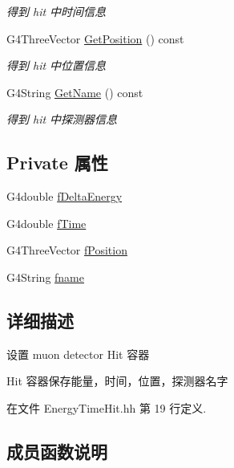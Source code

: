 \begin{DoxyCompactItemize}
\begin{DoxyCompactList}\small\item\em 得到 hit 中时间信息 \end{DoxyCompactList}\item 
G4\+Three\+Vector \hyperlink{classEnergyTimeHit_a4611709e7caf2e34f4e368dd8c4e8ad4}{Get\+Position} () const
\begin{DoxyCompactList}\small\item\em 得到 hit 中位置信息 \end{DoxyCompactList}\item 
G4\+String \hyperlink{classEnergyTimeHit_a7e348ee943ce7065910e75b0063108d5}{Get\+Name} () const
\begin{DoxyCompactList}\small\item\em 得到 hit 中探测器信息 \end{DoxyCompactList}\end{DoxyCompactItemize}
\subsection*{Private 属性}
\begin{DoxyCompactItemize}
\item 
G4double \hyperlink{classEnergyTimeHit_a3979f4ac628b68fad49d5014267bbb61}{f\+Delta\+Energy}
\item 
G4double \hyperlink{classEnergyTimeHit_a1c7ce3f598d87ae1855d7edb833d4486}{f\+Time}
\item 
G4\+Three\+Vector \hyperlink{classEnergyTimeHit_adb5230ba263dadd37f343c2c6b04bf55}{f\+Position}
\item 
G4\+String \hyperlink{classEnergyTimeHit_a892c47bfb7d81fe010e7e58413ab52fe}{fname}
\end{DoxyCompactItemize}


\subsection{详细描述}
设置 muon detector Hit 容器 

Hit 容器保存能量，时间，位置，探测器名字 

在文件 Energy\+Time\+Hit.\+hh 第 19 行定义.



\subsection{成员函数说明}
\mbox{\label{classEnergyTimeHit_a15aae5ff8efc3a4efc39c00c26308836}} 
